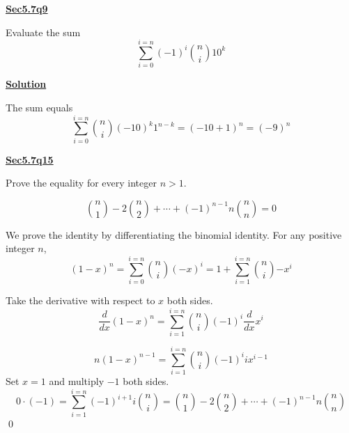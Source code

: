 \documentclass{article}
\newcommand{\new}[1]{
    \vspace{2mm}
    \noindent
    \textbf{
    \underline{#1}}
}
\newcommand{\m}{
    \cdot
}
\begin{document}
\new{Sec5.7q9}
Evaluate the sum 
\[
    \sum_{i = 0}^{i = n} (-1)^i\binom{n}{i} 10^k
\]
\new{Solution}
The sum equals 
\[
    \sum_{i = 0}^{i = n} \binom{n}{i} (-10)^k 1^{n - k}
    = (-10 + 1)^n = \boxed{(-9)^n}
\]


\new{Sec5.7q15}
Prove the equality for every integer $n > 1$. 

\[
    \binom{n}{1} - 2\binom{n}{2} + \cdots + (-1)^{n-1} n \binom{n}{n} = 0  
\]

\proof 
We prove the identity by differentiating the binomial identity. 
For any positive integer $n$, 
\[
    (1-x)^n = 
    \sum_{i = 0}^{i = n} \binom{n}{i} (-x)^i
    = 1 + \sum_{i = 1}^{i = n} \binom{n}{i} {-x}^i
\]

Take the derivative with respect to $x$ both sides. 
\[
    \frac{d}{dx}(1-x)^{n}
     =  \sum_{i = 1}^{i = n} \binom{n}{i} (-1)^i \frac{d}{dx}{x}^{i}
\]

\[
    n(1-x)^{n-1} = \sum_{i = 1}^{i = n} \binom{n}{i} (-1)^i i{x}^{i - 1}
\]
Set $x = 1$ and multiply $-1$ both sides. 
\[
    0\m(-1) = \sum_{i = 1}^{i = n}(-1)^{i + 1} i \binom{n}{i} 
    =     \binom{n}{1} - 2\binom{n}{2} + \cdots + (-1)^{n-1} n \binom{n}{n} 
\]
\hfill \qed
\end{document}
